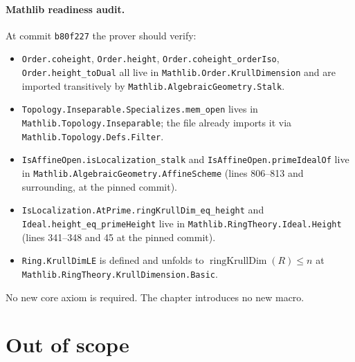 \paragraph{Mathlib readiness audit.} At commit \texttt{b80f227} the prover
should verify:
\begin{itemize}
  \item \texttt{Order.coheight}, \texttt{Order.height}, \texttt{Order.coheight\_orderIso},
    \texttt{Order.height\_toDual} all live in
    \texttt{Mathlib.Order.KrullDimension} and are imported transitively by
    \texttt{Mathlib.AlgebraicGeometry.Stalk}.
  \item \texttt{Topology.Inseparable.Specializes.mem\_open} lives in
    \texttt{Mathlib.Topology.Inseparable}; the file already imports it via
    \texttt{Mathlib.Topology.Defs.Filter}.
  \item \texttt{IsAffineOpen.isLocalization\_stalk} and
    \texttt{IsAffineOpen.primeIdealOf} live in
    \texttt{Mathlib.AlgebraicGeometry.AffineScheme} (lines 806--813 and
    surrounding, at the pinned commit).
  \item \texttt{IsLocalization.AtPrime.ringKrullDim\_eq\_height} and
    \texttt{Ideal.height\_eq\_primeHeight} live in
    \texttt{Mathlib.RingTheory.Ideal.Height} (lines 341--348 and 45 at the
    pinned commit).
  \item \texttt{Ring.KrullDimLE} is defined and unfolds to
    \(\operatorname{ringKrullDim}(R) \leq n\) at \texttt{Mathlib.RingTheory.KrullDimension.Basic}.
\end{itemize}
No new core axiom is required. The chapter introduces no new macro.

\section{Out of scope}
\label{sec:coheight_out_of_scope}

